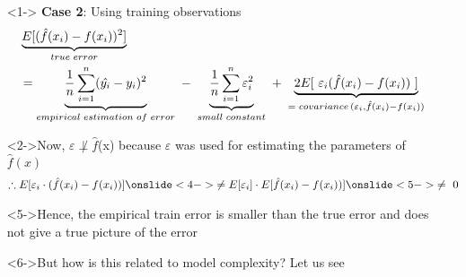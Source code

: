 \begin{frame}
	\begin{itemize}
		\justifying
		\setlength\itemsep{1em}
		\item[]<1-> \textbf{Case 2}: Using training observations\begin{align*}
			&\underbrace{	E[(\hat{f}(x_i)-f(x_i))^2]}_{true\hspace{0.09cm} error}\\&=\underbrace{\frac{1}{n}\sum_{i=1}^{n}(\hat{y_i}-y_i)^2}_{empirical\hspace{0.09cm}estimation\hspace{0.09cm}of\hspace{0.09cm}error}\ -\ \underbrace{\frac{1}{n}\sum_{i=1}^{n}\varepsilon_i^2}_{small\hspace{0.09cm}constant}\ +\ \underbrace{2E[\ \varepsilon_i (\hat{f}(x_i)-f(x_i))\ ]}_{= \hspace{0.09cm}covariance\hspace{0.05cm}(\varepsilon_i,\hat{f}(x_i)-f(x_i))}
		\end{align*}
		\item[]<2->Now, $\varepsilon\not\perp\hat{f}$(x) because $\varepsilon$ was used for estimating the parameters of $\hat{f}(x)$
		\begin{align*}
			\therefore E[\varepsilon_i \cdot ( \hat{f}(x_i)-f(x_i))]
			\onslide<4->{\ne E[\varepsilon_i] \cdot E[\hat{f}(x_i)-f(x_i))]}
			\onslide<5->{\ne\ 0}
		\end{align*}
							
		\item[]<5->Hence, the empirical train error is smaller than the true error and does not give a true picture of the error
		\item[]<6->But how is this related to model complexity? Let us see
							
							
	\end{itemize}
\end{frame}
